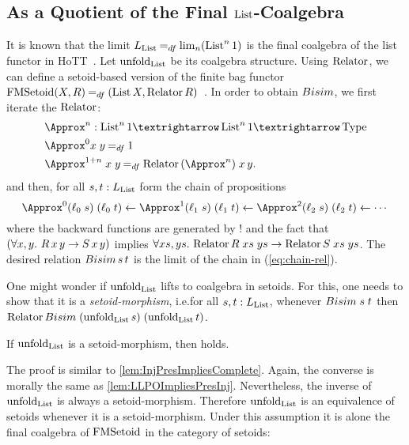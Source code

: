 \documentclass[a4paper,USenglish,cleveref]{lipics-v2021}
\begin{document}
\subsection{As a Quotient of the Final $\List$-Coalgebra}\label{sec:final-quotient-set}

It is known that the limit $\Lim{\List} \DefEq \lim_n (\List^n 1)$ is the final coalgebra of the list functor in HoTT~\cite{Ahrens2015}. Let $\coalg{\List}$ be its coalgebra structure.  Using $\Relator$, we can define a setoid-based version of the finite bag functor $\Op{FMSetoid}(X,R) \DefEq (\List X,\Relator R)$~\cite{Danielsson2012}.
In order to obtain $\Bisim$, we first iterate the $\Relator$:
\begin{align*}
  &\Approx^n : \List^n 1 → \List^n 1 → \Type \\
  &\Approx^0 x\;y \DefEq 1 \\
  &\Approx^{1+n}\;x\;y \DefEq \Relator \,(\Approx^n)\;x\,y.
\end{align*}
and then, for all $s, t : \Lim{\List}$ form the chain of propositions
\begin{equation}\label{eq:chain-rel}
  \Approx^0 (\ell_0\; s)\; (\ell_0\; t)
    \xleftarrow{} {\Approx^1 (\ell_1\; s)\; (\ell_1\; t)}
    \xleftarrow{} {\Approx^2 (\ell_2\; s)\; (\ell_2\; t)}
    \xleftarrow{} %
      \cdots
\end{equation}
where the backward functions are generated by ! and the fact that $(\forall x,y\mathpunct{.}\, R \,x\,y \to S \,x\,y)$ implies $\forall xs,ys \Where \Relator  R\;xs\;ys \to \Relator S\;xs\;ys$.
The desired relation $\Bisim\,s\,t$ is the limit of the chain in (\ref{eq:chain-rel}).

One might wonder if $\coalg{\List}$ lifts to coalgebra in setoids.
For this, one needs to show that it is a \emph{setoid-morphism},
i.e.\@ for all $s, t : \Lim{\List}$, whenever $\Bisim\;s\;t$
then $\Relator \Bisim\; (\coalg{\List} s)\; (\coalg{\List} t)$.

\begin{theorem}
  If $\coalg{\List}$ is a setoid-morphism, then \LLPO{} holds.
\end{theorem}
The proof is similar to \cref{lem:InjPresImpliesComplete}.
Again, the converse is morally the same as \cref{lem:LLPOImpliesPresInj}.
Nevertheless, the inverse of $\coalg{\List}$ is always a setoid-morphism.
Therefore $\coalg{\List}$ is an equivalence of setoids whenever it is a setoid-morphism.
Under this assumption it is alone the final coalgebra of $\Op{FMSetoid}$ in the category of setoids:
\end{document}
